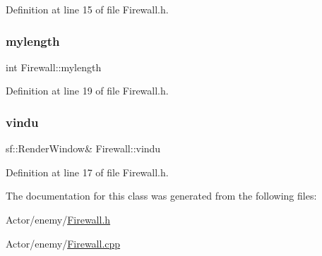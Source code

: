 Definition at line 15 of file Firewall.\+h.

\hypertarget{class_firewall_ad99a69d3d864a94b406d0dd7711abb73}{}\label{class_firewall_ad99a69d3d864a94b406d0dd7711abb73} 
\subsubsection{\texorpdfstring{mylength}{mylength}}
{\footnotesize\ttfamily int Firewall\+::mylength}



Definition at line 19 of file Firewall.\+h.

\hypertarget{class_firewall_a65ebc11322740e80e12fec7f0789142d}{}\label{class_firewall_a65ebc11322740e80e12fec7f0789142d} 
\subsubsection{\texorpdfstring{vindu}{vindu}}
{\footnotesize\ttfamily sf\+::\+Render\+Window\& Firewall\+::vindu}



Definition at line 17 of file Firewall.\+h.



The documentation for this class was generated from the following files\+:\begin{DoxyCompactItemize}
\item 
Actor/enemy/\hyperlink{_firewall_8h}{Firewall.\+h}\item 
Actor/enemy/\hyperlink{_firewall_8cpp}{Firewall.\+cpp}\end{DoxyCompactItemize}

